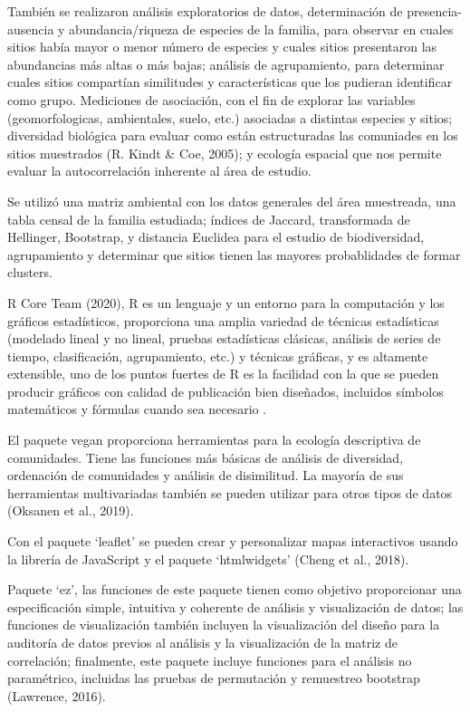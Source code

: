 \documentclass[11pt,]{article}
\begin{document}
También se realizaron análisis exploratorios de datos, determinación de
presencia-ausencia y abundancia/riqueza de especies de la familia, para
observar en cuales sitios había mayor o menor número de especies y
cuales sitios presentaron las abundancias más altas o más bajas;
análisis de agrupamiento, para determinar cuales sitios compartían
similitudes y características que los pudieran identificar como grupo.
Mediciones de asociación, con el fin de explorar las variables
(geomorfologicas, ambientales, suelo, etc.) asociadas a distintas
especies y sitios; diversidad biológica para evaluar como están
estructuradas las comuniades en los sitios muestrados (R. Kindt \& Coe,
2005); y ecología espacial que nos permite evaluar la autocorrelación
inherente al área de estudio.

Se utilizó una matriz ambiental con los datos generales del área
muestreada, una tabla censal de la familia estudiada; índices de
Jaccard, transformada de Hellinger, Bootstrap, y distancia Euclidea para
el estudio de biodiversidad, agrupamiento y determinar que sitios tienen
las mayores probablidades de formar clusters.

R Core Team (2020), R es un lenguaje y un entorno para la computación y
los gráficos estadísticos, proporciona una amplia variedad de técnicas
estadísticas (modelado lineal y no lineal, pruebas estadísticas
clásicas, análisis de series de tiempo, clasificación, agrupamiento,
etc.) y técnicas gráficas, y es altamente extensible, uno de los puntos
fuertes de R es la facilidad con la que se pueden producir gráficos con
calidad de publicación bien diseñados, incluidos símbolos matemáticos y
fórmulas cuando sea necesario .

El paquete vegan proporciona herramientas para la ecología descriptiva
de comunidades. Tiene las funciones más básicas de análisis de
diversidad, ordenación de comunidades y análisis de disimilitud. La
mayoría de sus herramientas multivariadas también se pueden utilizar
para otros tipos de datos (Oksanen et al., 2019).

Con el paquete `leaflet' se pueden crear y personalizar mapas
interactivos usando la librería de JavaScript y el paquete `htmlwidgets'
(Cheng et al., 2018).

Paquete `ez', las funciones de este paquete tienen como objetivo
proporcionar una especificación simple, intuitiva y coherente de
análisis y visualización de datos; las funciones de visualización
también incluyen la visualización del diseño para la auditoría de datos
previos al análisis y la visualización de la matriz de correlación;
finalmente, este paquete incluye funciones para el análisis no
paramétrico, incluidas las pruebas de permutación y remuestreo bootstrap
(Lawrence, 2016).
\end{document}
